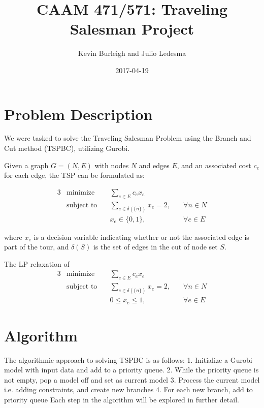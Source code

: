 \documentclass{article}
\title{CAAM 471/571: Traveling Salesman Project}
\date{2017-04-19}
\author{Kevin Burleigh and Julio Ledesma}
\begin{document}
\maketitle


\section{Problem Description}
We were tasked
to solve the Traveling Salesman Problem
using the Branch and Cut method
(TSPBC),
utilizing Gurobi.

Given a graph $G = (N,E)$ with nodes $N$ and edges $E$,
and an associated cost $c_e$ for each edge,
the TSP can be formulated as:

\begin{alignat*}{3}
 & \text{minimize}         & \sum_{e \in E}{c_e x_e} & \\
 & \text{subject to} \quad & \sum_{e \in \delta(\{n\})}{x_e} = 2, \quad & \forall n \in N \\
 &                         & x_e \in \{ 0,1 \}, \quad                     & \forall e \in E
\end{alignat*}

where $x_e$ is a decision variable
indicating whether or not
the associated edge is part of the tour,
and $\delta(S)$ is the set of edges
in the cut of node set $S$.


The LP relaxation of
\begin{alignat*}{3}
 & \text{minimize}         & \sum_{e \in E}{c_e x_e} & \\
 & \text{subject to} \quad & \sum_{e \in \delta(\{n\})}{x_e} = 2, \quad & \forall n \in N \\
 &                         & 0 \leq x_e \leq 1, \quad                     & \forall e \in E
\end{alignat*}

\section{Algorithm}

The algorithmic approach to solving TSPBC is as follows:
1. Initialize a Gurobi model with input data and add to a priority queue.
2. While the priority queue is not empty, pop a model off and set as current model
3. Process the current model i.e. adding constraints, and create new branches
4. For each new branch, add to priority queue
Each step in the algorithm will be explored in further detail.
\end{document}
